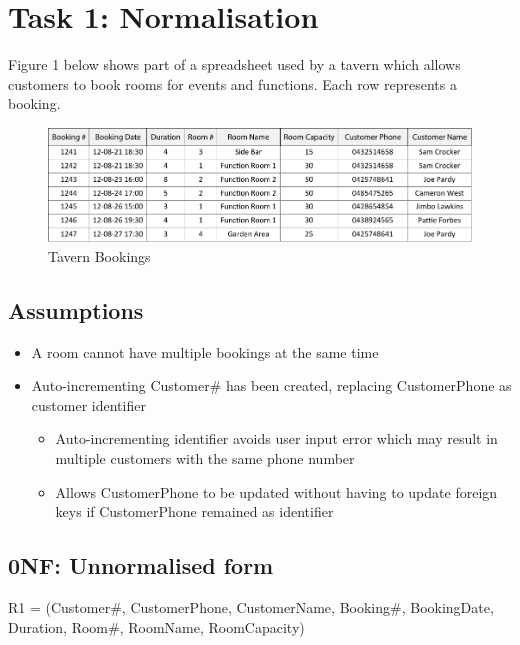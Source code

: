 \section{Task 1: Normalisation}

Figure 1 below shows part of a spreadsheet used by a tavern which allows customers to book rooms for events and functions. Each row represents a booking.

\begin{figure}[H]
\centering
\caption{Tavern Bookings}
\includegraphics[scale=0.8]{./img/task1.pdf}
\end{figure}

\subsection{Assumptions}

\begin{itemize}
\item A room cannot have multiple bookings at the same time
\item Auto-incrementing Customer\# has been created, replacing CustomerPhone as customer identifier
	\begin{itemize}
	\item Auto-incrementing identifier avoids user input error which may result in multiple customers with the same phone number
	\item Allows CustomerPhone to be updated without having to update foreign keys if CustomerPhone remained as identifier
	\end{itemize}
\end{itemize}

\subsection{0NF: Unnormalised form}

R1 = (Customer\#, CustomerPhone, CustomerName, {Booking\#, BookingDate, Duration, Room\#, RoomName, RoomCapacity})

